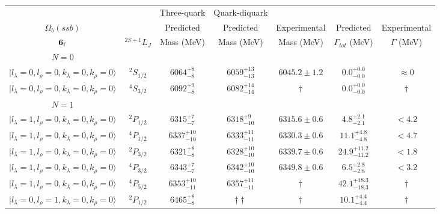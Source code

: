 \begin{tabular}{c c| c c c c c }\hline \hline
            &  & Three-quark &  Quark-diquark    &               &              &  \\ 
$\Omega_{b}(ssb)$&  & Predicted   &    Predicted   &  Experimental &  Predicted            & Experimental \\ 
${\bf {6}}_{\rm f}$  & $^{2S+1}L_{J}$ & Mass (MeV)  &   Mass (MeV)   &  Mass (MeV)   &  $\Gamma_{tot}$ (MeV) & $\Gamma$ (MeV) \\ \hline
\hline
 $N=0$  &  &  &  &  &  \\ 
$\vert l_{\lambda}\!\!=\!0, l_{\rho}\!\!=\!0, k_{\lambda}\!\!=\!0, k_{\rho}\!\!=\!0 \rangle$ & $^{2}S_{1/2}$ & $6064^{+8}_{-8}$ & $6059^{+13}_{-13}$ & $6045.2\pm 1.2$ & $0.0^{+0.0}_{-0.0}$ & $\approx 0$ \\ 
$\vert l_{\lambda}\!\!=\!0, l_{\rho}\!\!=\!0, k_{\lambda}\!\!=\!0, k_{\rho}\!\!=\!0 \rangle$ & $^{4}S_{3/2}$ & $6092^{+9}_{-8}$ & $6082^{+14}_{-14}$ & $\dagger$ & $0.0^{+0.0}_{-0.0}$ & $\dagger$ \\ 
\hline
 $N=1$  &  &  &  &  &  \\ 
$\vert l_{\lambda}\!\!=\!1, l_{\rho}\!\!=\!0, k_{\lambda}\!\!=\!0, k_{\rho}\!\!=\!0 \rangle$ & $^{2}P_{1/2}$ & $6315^{+7}_{-7}$ & $6318^{+9}_{-10}$ & $6315.6\pm 0.6$ & $4.8^{+2.1}_{-2.1}$ & $<4.2$ \\ 
$\vert l_{\lambda}\!\!=\!1, l_{\rho}\!\!=\!0, k_{\lambda}\!\!=\!0, k_{\rho}\!\!=\!0 \rangle$ & $^{4}P_{1/2}$ & $6337^{+10}_{-10}$ & $6333^{+11}_{-11}$ & $6330.3\pm 0.6$ & $11.1^{+4.8}_{-4.8}$ & $<4.7$ \\ 
$\vert l_{\lambda}\!\!=\!1, l_{\rho}\!\!=\!0, k_{\lambda}\!\!=\!0, k_{\rho}\!\!=\!0 \rangle$ & $^{2}P_{3/2}$ & $6321^{+8}_{-8}$ & $6328^{+10}_{-10}$ & $6339.7\pm 0.6$ & $24.9^{+11.2}_{-11.2}$ & $<1.8$ \\ 
$\vert l_{\lambda}\!\!=\!1, l_{\rho}\!\!=\!0, k_{\lambda}\!\!=\!0, k_{\rho}\!\!=\!0 \rangle$ & $^{4}P_{3/2}$ & $6343^{+7}_{-7}$ & $6342^{+10}_{-10}$ & $6349.8\pm 0.6$ & $6.5^{+2.8}_{-2.8}$ & $<3.2$ \\ 
$\vert l_{\lambda}\!\!=\!1, l_{\rho}\!\!=\!0, k_{\lambda}\!\!=\!0, k_{\rho}\!\!=\!0 \rangle$ & $^{4}P_{5/2}$ & $6353^{+10}_{-11}$ & $6357^{+11}_{-11}$ & $\dagger$ & $42.1^{+18.3}_{-18.3}$ & $\dagger$ \\ 
$\vert l_{\lambda}\!\!=\!0, l_{\rho}\!\!=\!1, k_{\lambda}\!\!=\!0, k_{\rho}\!\!=\!0 \rangle$ & $^{2}P_{1/2}$ & $6465^{+8}_{-8}$ & $\dagger\dagger$ & $\dagger$ & $10.1^{+4.4}_{-4.4}$ & $\dagger$ \\ 

\end{tabular}
